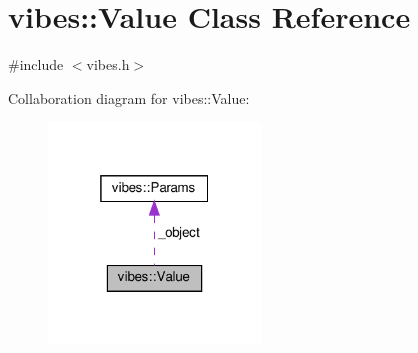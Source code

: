 \hypertarget{classvibes_1_1_value}{}\section{vibes\+:\+:Value Class Reference}
\label{classvibes_1_1_value}


{\ttfamily \#include $<$vibes.\+h$>$}



Collaboration diagram for vibes\+:\+:Value\+:\nopagebreak
\begin{figure}[H]
\begin{center}
\leavevmode
\includegraphics[width=160pt]{classvibes_1_1_value__coll__graph}
\end{center}
\end{figure}
